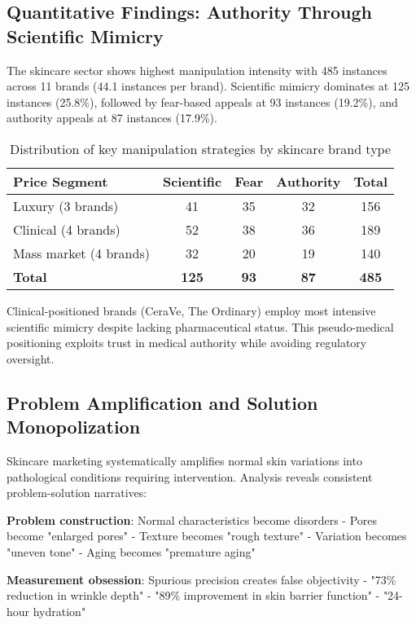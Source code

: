 \subsection{Quantitative Findings: Authority Through Scientific Mimicry}

The skincare sector shows highest manipulation intensity with 485 instances across 11 brands (44.1 instances per brand). Scientific mimicry dominates at 125 instances (25.8\%), followed by fear-based appeals at 93 instances (19.2\%), and authority appeals at 87 instances (17.9\%).

\begin{table}[h]
\centering
\begin{tabular}{|l|c|c|c|c|}
\hline
\textbf{Price Segment} & \textbf{Scientific} & \textbf{Fear} & \textbf{Authority} & \textbf{Total} \\
\hline
Luxury (3 brands) & 41 & 35 & 32 & 156 \\
Clinical (4 brands) & 52 & 38 & 36 & 189 \\
Mass market (4 brands) & 32 & 20 & 19 & 140 \\
\hline
\textbf{Total} & \textbf{125} & \textbf{93} & \textbf{87} & \textbf{485} \\
\hline
\end{tabular}
\caption{Distribution of key manipulation strategies by skincare brand type}
\end{table}

Clinical-positioned brands (CeraVe, The Ordinary) employ most intensive scientific mimicry despite lacking pharmaceutical status. This pseudo-medical positioning exploits trust in medical authority while avoiding regulatory oversight.

\subsection{Problem Amplification and Solution Monopolization}

Skincare marketing systematically amplifies normal skin variations into pathological conditions requiring intervention. Analysis reveals consistent problem-solution narratives:

\textbf{Problem construction}: Normal characteristics become disorders
- Pores become "enlarged pores"
- Texture becomes "rough texture"
- Variation becomes "uneven tone"
- Aging becomes "premature aging"

\textbf{Measurement obsession}: Spurious precision creates false objectivity
- "73\% reduction in wrinkle depth"
- "89\% improvement in skin barrier function"
- "24-hour hydration"

